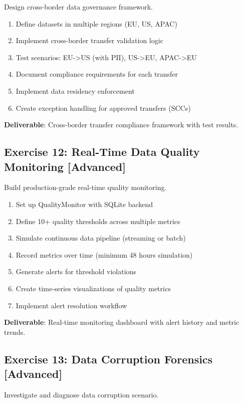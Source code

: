 Design cross-border data governance framework.

\begin{enumerate}
    \item Define datasets in multiple regions (EU, US, APAC)
    \item Implement cross-border transfer validation logic
    \item Test scenarios: EU->US (with PII), US->EU, APAC->EU
    \item Document compliance requirements for each transfer
    \item Implement data residency enforcement
    \item Create exception handling for approved transfers (SCCs)
\end{enumerate}

\textbf{Deliverable}: Cross-border transfer compliance framework with test results.

\subsection{Exercise 12: Real-Time Data Quality Monitoring [Advanced]}

Build production-grade real-time quality monitoring.

\begin{enumerate}
    \item Set up QualityMonitor with SQLite backend
    \item Define 10+ quality thresholds across multiple metrics
    \item Simulate continuous data pipeline (streaming or batch)
    \item Record metrics over time (minimum 48 hours simulation)
    \item Generate alerts for threshold violations
    \item Create time-series visualizations of quality metrics
    \item Implement alert resolution workflow
\end{enumerate}

\textbf{Deliverable}: Real-time monitoring dashboard with alert history and metric trends.

\subsection{Exercise 13: Data Corruption Forensics [Advanced]}

Investigate and diagnose data corruption scenario.


